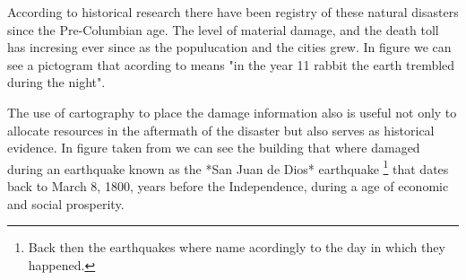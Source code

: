 According to historical research there have been registry of these natural disasters since the Pre-Columbian age. The level of material damage, and the death toll has incresing ever since as the populucation and the cities grew. In figure \cite{fig:codice} we can see a pictogram that acording to \cite{sismosmexico} means "in the year 11 rabbit the earth trembled during the night".\\


\begin{figure}[h]
  \begin{center}
  \end{center}
\end{figure}

The use of cartography to place the damage information also is useful not only to allocate resources in the aftermath of the disaster but also serves as historical evidence. In figure \cite{fig:quake1800} taken from \cite{AG3316} we can see the building that where damaged during an earthquake known as the *San Juan de Dios* earthquake \footnote{Back then the earthquakes where name acordingly to the day in which they happened.} that dates back to March 8, 1800, years before the Independence, during a age of economic and social prosperity.\\

